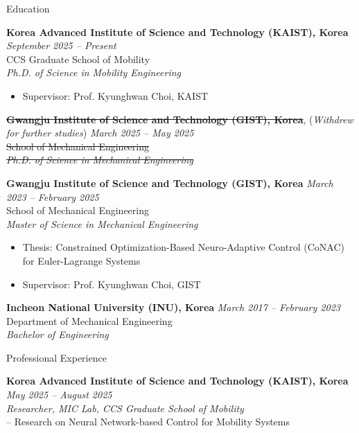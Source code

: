 \documentclass{resume} %
\begin{document}
\begin{rSection}{Education}

\small{
  {\bf Korea Advanced Institute of Science and Technology (KAIST), Korea}
    \hfill 
    {\em September 2025 – Present} 
    \\
    CCS Graduate School of Mobility
    \\
    {\textit {Ph.D. of Science in Mobility Engineering}} 
    \vspace{-.2em}
    \begin{itemize}
        \item Supervisor: Prof. Kyunghwan Choi, KAIST
    \end{itemize}

  \sout{\bf{Gwangju Institute of Science and Technology (GIST), Korea}}, (\textit{Withdrew for further studies})
    \hfill 
    {\em March 2025 – May 2025} 
    \\
    \sout{School of Mechanical Engineering}
    \\
    \sout{\textit {Ph.D. of Science in Mechanical Engineering}} 

  {\bf Gwangju Institute of Science and Technology (GIST), Korea} 
    \hfill 
    {\em March 2023 – February 2025} 
    \\
    School of Mechanical Engineering
    \\
    {\textit {Master of Science in Mechanical Engineering}} 
    \vspace{-.5em}
    \begin{itemize}
      \item Thesis: Constrained Optimization-Based Neuro-Adaptive Control (CoNAC) for Euler-Lagrange Systems
      \vspace{-.25em}
      \item Supervisor: Prof. Kyunghwan Choi, GIST
    \end{itemize}

  {\bf Incheon National University (INU), Korea} 
    \hfill 
    {\em March 2017 – February 2023} 
    \\
    Department of Mechanical Engineering
    \\
    {\textit {Bachelor of Engineering}} 
}


\end{rSection}

\begin{rSection}{Professional Experience}

\small{

  {\bf Korea Advanced Institute of Science and Technology (KAIST), Korea}
  \hfill 
  {\em May 2025 – August 2025} 
  \\
  {\textit {Researcher, MIC Lab, CCS Graduate School of Mobility}}
  \\
  – Research on Neural Network-based Control for Mobility Systems

}

\end{rSection}
\end{document}

